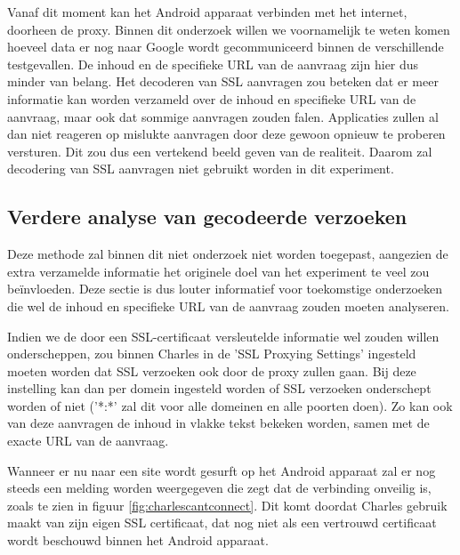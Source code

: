 Vanaf dit moment kan het Android apparaat verbinden met het internet, doorheen de proxy. Binnen dit onderzoek willen we voornamelijk te weten komen hoeveel data er nog naar Google wordt gecommuniceerd binnen de verschillende testgevallen. De inhoud en de specifieke URL van de aanvraag zijn hier dus minder van belang. Het decoderen van SSL aanvragen zou beteken dat er meer informatie kan worden verzameld over de inhoud en specifieke URL van de aanvraag, maar ook dat sommige aanvragen zouden falen. Applicaties zullen al dan niet reageren op mislukte aanvragen door deze gewoon opnieuw te proberen versturen. Dit zou dus een vertekend beeld geven van de realiteit. Daarom zal decodering van SSL aanvragen niet gebruikt worden in dit experiment. 

\subsection{Verdere analyse van gecodeerde verzoeken}
\label{subsec:decodessl}
Deze methode zal binnen dit niet onderzoek niet worden toegepast, aangezien de extra verzamelde informatie het originele doel van het experiment te veel zou beïnvloeden. Deze sectie is dus louter informatief voor toekomstige onderzoeken die wel de inhoud en specifieke URL van de aanvraag zouden moeten analyseren.

Indien we de door een SSL-certificaat versleutelde informatie wel zouden willen onderscheppen, zou binnen Charles in de 'SSL Proxying Settings' ingesteld moeten worden dat SSL verzoeken ook door de proxy zullen gaan. Bij deze instelling kan dan per domein ingesteld worden of SSL verzoeken onderschept worden of niet ('*:*' zal dit voor alle domeinen en alle poorten doen). Zo kan ook van deze aanvragen de inhoud in vlakke tekst bekeken worden, samen met de exacte URL van de aanvraag. 

Wanneer er nu naar een site wordt gesurft op het Android apparaat zal er nog steeds een melding worden weergegeven die zegt dat de verbinding onveilig is, zoals te zien in figuur \ref{fig:charlescantconnect}. Dit komt doordat Charles gebruik maakt van zijn eigen SSL certificaat, dat nog niet als een vertrouwd certificaat wordt beschouwd binnen het Android apparaat.

